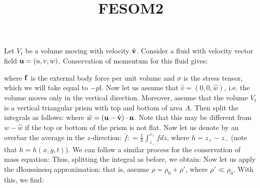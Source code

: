 \documentclass[10pt]{article}
\begin{document}
\title{FESOM2}
\date{}
\maketitle

Let $V_{t}$ be a volume moving with velocity $\hat{\mathbf{v}}$. Consider a fluid with velocity vector field $\textbf{u} = (u,v,w)$. Conservation of momentum for this fluid gives:

where $\mathbf{f}$ is the external body force per unit volume and $\sigma$ is the stress tensor, which we will take equal to $-p\mathbb{I}$. Now let us assume that $\hat{v} = (0,0,\hat{w})$, i.e. the volume moves only in the vertical direction. Moreover, assume that the volume $V_{t}$ is a vertical triangular prism with top and bottom of area $A$. Then split the integrals as follows:
where $\tilde{w} = (\mathbf{u} - \hat{\mathbf{v}})\cdot\mathbf{n}$. Note that this may be different from $w-\hat{w}$ if the top or bottom of the prism is not flat. Now let us denote by an overbar the average in the $z$-direction: $\bar{f} : = \tfrac{1}{h}\int_{z_{-}}^{z_{+}} f dz$, where $h = z_{+} - z_{-}$ (note that $h = h(x,y,t)$). 
We can follow a similar process for the conservation of mass equation:
Thus, splitting the integral as before, we obtain:
Now let us apply the \i{Boussinesq approximation}: that is, assume $\rho = \rho_{0} + \rho'$, where $\rho' \ll \rho_{0}$. With this, we find:
\end{document}

